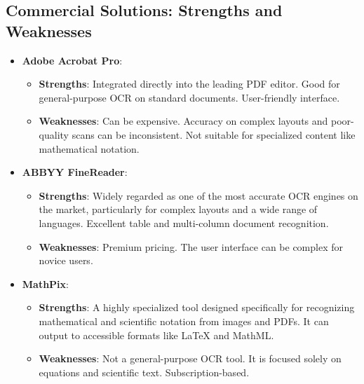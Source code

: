 \subsection{Commercial Solutions: Strengths and Weaknesses}
\label{subsec:ocr-commercial-solutions}
\begin{itemize}
	\item \textbf{Adobe Acrobat Pro}:
	      \begin{itemize}
		      \item \textbf{Strengths}: Integrated directly into the leading PDF editor. Good for general-purpose OCR on standard documents. User-friendly interface.
		      \item \textbf{Weaknesses}: Can be expensive. Accuracy on complex layouts and poor-quality scans can be inconsistent. Not suitable for specialized content like mathematical notation.
	      \end{itemize}
	\item \textbf{ABBYY FineReader}:
	      \begin{itemize}
		      \item \textbf{Strengths}: Widely regarded as one of the most accurate OCR engines on the market, particularly for complex layouts and a wide range of languages. Excellent table and multi-column document recognition.
		      \item \textbf{Weaknesses}: Premium pricing. The user interface can be complex for novice users.
	      \end{itemize}
	\item \textbf{MathPix}:
	      \begin{itemize}
		      \item \textbf{Strengths}: A highly specialized tool designed specifically for recognizing mathematical and scientific notation from images and PDFs. It can output to accessible formats like LaTeX and MathML.
		      \item \textbf{Weaknesses}: Not a general-purpose OCR tool. It is focused solely on equations and scientific text. Subscription-based.
	      \end{itemize}
\end{itemize}

